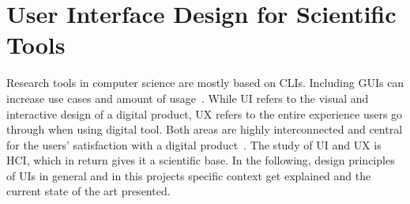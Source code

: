 




\section{User Interface Design for Scientific Tools}


Research tools in computer science are mostly based on \acp{CLI}. Including \acp{GUI} can increase use cases and amount of usage~\cite{sampath_accessibility_2021}.
While \ac{UI} refers to the visual and interactive design of a digital product, \ac{UX} refers to the entire experience users go through when using digital tool. Both areas are highly interconnected and central for the users' satisfaction with a digital product~\cite{hamidli_introduction_2023}. %
The study of \ac{UI} and \ac{UX} is \ac{HCI}, which in return gives it a scientific base. 
In the following, design principles of \acp{UI} in general and in this projects specific context get explained and the current state of the art presented.  %



